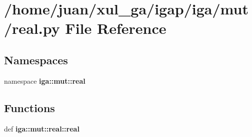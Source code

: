 \section{/home/juan/xul\_\-ga/igap/iga/mut/real.py File Reference}
\label{real_8py}
\subsection*{Namespaces}
\begin{CompactItemize}
\item 
namespace {\bf iga::mut::real}
\end{CompactItemize}
\subsection*{Functions}
\begin{CompactItemize}
\item 
def {\bf iga::mut::real::real}
\end{CompactItemize}
